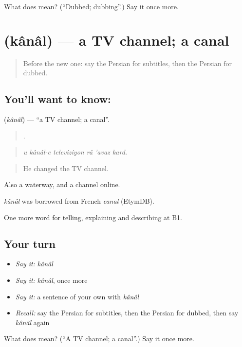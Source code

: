 \begin{tcolorbox}[breakable,colback=teal!4,colframe=teal!35!black,title={Before you move on}]
What does  mean? (\textquotedblleft{}Dubbed; dubbing\textquotedblright{}.) Say it once more.
\end{tcolorbox}
\section[\texorpdfstring{\fa{کانال} (kânâl)}{کانال (kânâl)}]{ (kânâl) — a TV channel; a canal}

\label{lesson:FA-C531-kanal}



\begin{quote}
Before the new one: say the Persian for subtitles, then the Persian for dubbed.
\end{quote}

\subsection*{You'll want to know: }
\textbf{} (\emph{kânâl}) — \textquotedblleft{}a TV channel; a canal\textquotedblright{}.

\begin{quote}
     .
\end{quote}

\begin{quote}
\emph{u kânâl-e televiziyon râ 'avaz kard.}
\end{quote}

\begin{quote}
He changed the TV channel.
\end{quote}

Also a waterway, and a channel online.

\begin{cousinweb}
\emph{kânâl} was borrowed from French \emph{canal} (EtymDB).
\end{cousinweb}

\begin{grammarlens}[title={What you've built}]
One more word for telling, explaining and describing at B1.
\end{grammarlens}

\subsection*{Your turn}
\begin{itemize}
\raggedright
  \item \emph{Say it:} \emph{kânâl}
  \item \emph{Say it:} \emph{kânâl}, once more
  \item \emph{Say it:} a sentence of your own with \emph{kânâl}
  \item \emph{Recall:} say the Persian for subtitles, then the Persian for dubbed, then say \emph{kânâl} again
\end{itemize}

\begin{tcolorbox}[breakable,colback=teal!4,colframe=teal!35!black,title={Before you move on}]
What does  mean? (\textquotedblleft{}A TV channel; a canal\textquotedblright{}.) Say it once more.
\end{tcolorbox}
